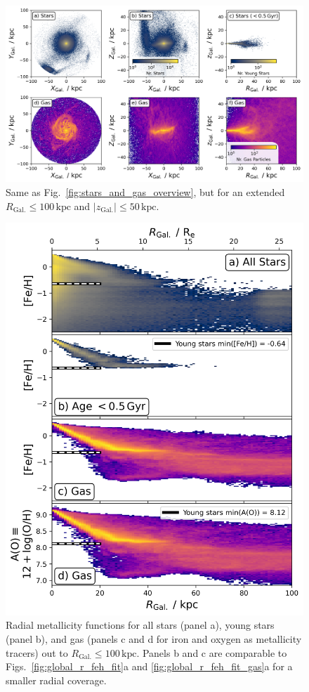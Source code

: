 \documentclass[twocolumn,apj,numberedappendix,appendixfloats,twocolappendix]{openjournal}
\begin{document}
\begin{CJK*}{UTF8}{gbsn}
\begin{figure}
    \centering
    \includegraphics[width=\textwidth]{figures/stars_and_gas_overview_100kpc.png}
    \caption{Same as Fig.~\ref{fig:stars_and_gas_overview}, but for an extended $R_\mathrm{Gal.} \leq 100\,\mathrm{kpc}$ and $\vert z_\mathrm{Gal.} \vert \leq 50\,\mathrm{kpc}$.}
    \label{fig:stars_and_gas_overview_100kpc}
\end{figure}

\begin{figure}
    \centering
    \includegraphics[width=0.95\columnwidth]{figures/trace_stars_and_gas_100kpc.png}
    \caption{Radial metallicity functions for all stars (panel a), young stars (panel b), and gas (panels c and d for iron and oxygen as metallicity tracers) out to $R_\mathrm{Gal.} \leq 100\,\mathrm{kpc}$. Panels b and c are comparable to Figs.~\ref{fig:global_r_feh_fit}a and \ref{fig:global_r_feh_fit_gas}a for a smaller radial coverage.}
    \label{fig:trace_stars_and_gas_100kpc}
\end{figure}


\end{CJK*}
\end{document}
